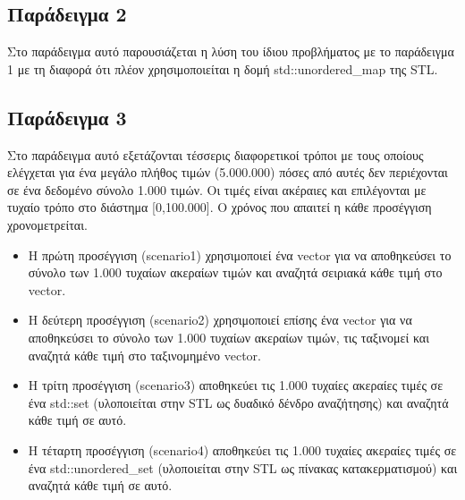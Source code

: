 





\subsection{Παράδειγμα 2}
Στο παράδειγμα αυτό παρουσιάζεται η λύση του ίδιου προβλήματος με το παράδειγμα 1 με τη διαφορά ότι πλέον χρησιμοποιείται η δομή std::unordered\_map της STL.





\subsection{Παράδειγμα 3}
Στο παράδειγμα αυτό εξετάζονται τέσσερις διαφορετικοί τρόποι με τους οποίους ελέγχεται για ένα μεγάλο πλήθος τιμών (5.000.000) πόσες από αυτές δεν περιέχονται σε ένα δεδομένο σύνολο 1.000 τιμών. Οι τιμές είναι ακέραιες και επιλέγονται με τυχαίο τρόπο στο διάστημα [0,100.000]. Ο χρόνος που απαιτεί η κάθε προσέγγιση χρονομετρείται.
\begin{itemize}[noitemsep]
\item Η πρώτη προσέγγιση (scenario1) χρησιμοποιεί ένα vector για να αποθηκεύσει το σύνολο των 1.000 τυχαίων ακεραίων τιμών και αναζητά σειριακά κάθε τιμή στο vector. 
\item Η δεύτερη προσέγγιση (scenario2) χρησιμοποιεί επίσης ένα vector για να αποθηκεύσει το σύνολο των 1.000 τυχαίων ακεραίων τιμών, τις ταξινομεί και αναζητά κάθε τιμή στο ταξινομημένο vector. 
\item Η τρίτη προσέγγιση (scenario3) αποθηκεύει τις 1.000 τυχαίες ακεραίες τιμές σε ένα std::set (υλοποιείται στην STL ως δυαδικό δένδρο αναζήτησης) και αναζητά κάθε τιμή σε αυτό. 
\item Η τέταρτη προσέγγιση (scenario4) αποθηκεύει τις 1.000 τυχαίες ακεραίες τιμές σε ένα std::unordered\_set (υλοποιείται στην STL ως πίνακας κατακερματισμού) και αναζητά κάθε τιμή σε αυτό.
\end{itemize}

